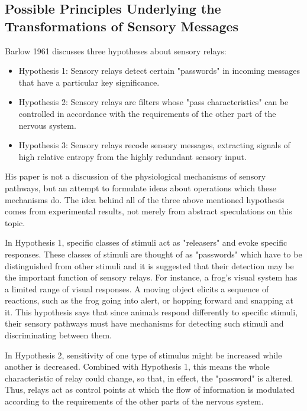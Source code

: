 \documentclass[twoside]{article}
\begin{document}
\begin{multicols}{2}




\section{Possible Principles Underlying the Transformations of Sensory Messages}

Barlow 1961 discusses three hypotheses about sensory relays:
\begin{itemize}
	\item Hypothesis 1: Sensory relays detect certain "passwords" in incoming messages that have a particular key significance.
	\item Hypothesis 2: Sensory relays are filters whose "pass characteristics" can be controlled in accordance with the requirements of the other part of the nervous system.
	\item Hypothesis 3: Sensory relays recode sensory messages, extracting signals of high relative entropy from the highly redundant sensory input.
\end{itemize}
His paper is not a discussion of the physiological mechanisms of sensory pathways, but an attempt to formulate ideas about operations which these mechanisms do. The idea behind all of the three above mentioned hypothesis comes from experimental results, not merely from abstract speculations on this topic. 

In Hypothesis 1, specific classes of stimuli act as "releasers" and evoke specific responses. These classes of stimuli are thought of as "passwords" which have to be distinguished from other stimuli and it is suggested that their detection may be the important function of sensory relays. For instance, a frog's visual system has a limited range of visual responses. A moving object elicits a sequence of reactions, such as the frog going into alert, or hopping forward and snapping at it. This hypothesis says that since animals respond differently to specific stimuli, their sensory pathways must have mechanisms for detecting such stimuli and discriminating between them. 

In Hypothesis 2, sensitivity of one type of stimulus might be increased while another is decreased. Combined with Hypothesis 1, this means the whole characteristic of relay could change, so that, in effect, the "password" is altered. Thus, relays act as control points at which the flow of information is modulated according to the requirements of the other parts of the nervous system.


\end{multicols}
\end{document}
